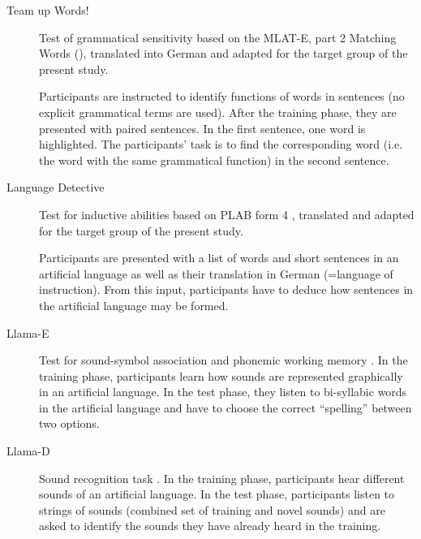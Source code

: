 \documentclass[output=paper]{langsci/langscibook}
\begin{document}
\begin{description}
\item[Team up Words!] Test of grammatical sensitivity based on the MLAT-E, part 2 Matching Words (\citealt{CarrollSapon2010}), translated into German and adapted for the target group of the present study.

Participants are instructed to identify functions of words in sentences (no explicit grammatical terms are used). After the training phase, they are presented with paired sentences. In the first sentence, one word is highlighted. The participants’ task is to find the corresponding word (i.e. the word with the same grammatical function) in the second sentence.

\item[Language Detective] Test for inductive abilities based on PLAB form 4 \citep{PimsleurEtAl2004}, translated and adapted for the target group of the present study.

Participants are presented with a list of words and short sentences in an artificial language as well as their translation in German (=language of instruction). From this input, participants have to deduce how sentences in the artificial language may be formed.

\item[Llama-E] Test for sound-symbol association and phonemic working memory \citep{MearaEtAl2001}. In the training phase, participants learn how sounds are represented graphically in an artificial language. In the test phase, they listen to bi-syllabic words in the artificial language and have to choose the correct “spelling” between two options.

\item[Llama-D] Sound recognition task \citep{MearaEtAl2001}. In the training phase, participants hear different sounds of an artificial language. In the test phase, participants listen to strings of sounds (combined set of training and novel sounds) and are asked to identify the sounds they have already heard in the training.
\end{description}
\end{document}
